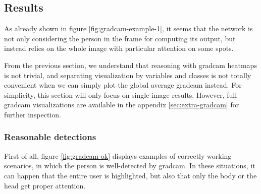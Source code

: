 \subsection{Results}
\label{subsec:gradcam-results}

As already shown in figure \ref{fig:gradcam-example-1}, it seems that the network is not only considering the person in the frame for computing its output, but instead relies on the whole image with particular attention on some spots.

From the previous section, we understand that reasoning with \gls{gradcam} heatmaps is not trivial, and separating visualization by variables and classes is not totally convenient when we can simply plot the global average \gls{gradcam} instead. For simplicity, this section will only focus on single-image results. However, full \gls{gradcam} visualizations are available in the appendix \ref{sec:extra-gradcam} for further inspection.

\subsubsection*{Reasonable detections}

First of all, figure \ref{fig:gradcam-ok} displays examples of correctly working scenarios, in which the person is well-detected by \gls{gradcam}. In these situations, it can happen that the entire user is highlighted, but also that only the body or the head get proper attention.

